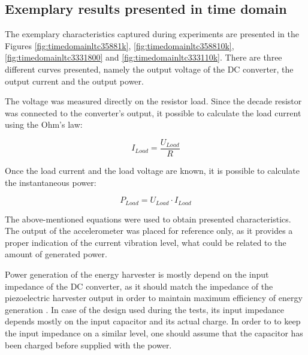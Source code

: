 \documentclass[12pt,a4paper]{article}
\begin{document}
\subsection{Exemplary results presented in time domain}

The exemplary characteristics captured during experiments are presented in the Figures \ref{fig:timedomainltc35881k}, \ref{fig:timedomainltc358810k}, \ref{fig:timedomainltc3331800} and \ref{fig:timedomainltc333110k}. There are three different curves presented, namely the output voltage of the DC converter, the output current and the output power.
\par

The voltage was measured directly on the resistor load. Since the decade resistor was connected to the converter's output, it possible to calculate the load current using the Ohm's law:

\begin{equation}
	I_{Load} = \frac{U_{Load}}{R}
	\label{eqn:current}
\end{equation}

Once the load current and the load voltage are known, it is possible to calculate the instantaneous power:

\begin{equation}
	P_{Load} = U_{Load} \cdot I_{Load}
	\label{eqn:power}
\end{equation}

The above-mentioned equations were used to obtain presented characteristics. The output of the accelerometer was placed for reference only, as it provides a proper indication of the current vibration level, what could be related to the amount of generated power.

\par
Power generation of the energy harvester is mostly depend on the input impedance of the DC converter, as it should match the impedance of the piezoelectric harvester output in order to maintain maximum efficiency of energy generation \cite{EnHv2}. In case of the design used during the tests, its input impedance depends mostly on the input capacitor and its actual charge. In order to to keep the input impedance on a similar level, one should assume that the capacitor has been charged before  supplied with the power.
\end{document}
